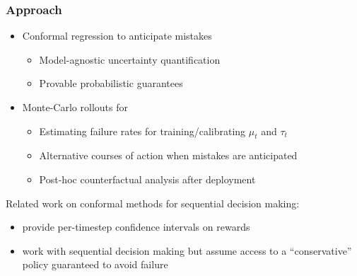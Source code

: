 \documentclass[handout]{beamer}
\begin{document}
\begin{frame}
    \frametitle{Approach}

    \begin{itemize}
        \item Conformal regression \cite{lei2018distribution} to anticipate mistakes
        \begin{itemize}
            \item Model-agnostic uncertainty quantification
            \item Provable probabilistic guarantees
        \end{itemize}

        \item Monte-Carlo rollouts for
        \begin{itemize}
            \item Estimating failure rates for training/calibrating $\mu_t$ and $\tau_t$
            \item Alternative courses of action when mistakes are anticipated
            \item Post-hoc counterfactual analysis after deployment \cite{stepin2021survey}
        \end{itemize}

    \end{itemize}

    Related work on conformal methods for sequential decision making:
    \begin{itemize}
    \item \cite{dietterich2022conformal} provide per-timestep confidence intervals on rewards
    \item \cite{lekeufack2024conformal} work with sequential decision making but assume access to a ``conservative'' policy guaranteed to avoid failure 
    \end{itemize}

\end{frame}
\end{document}
